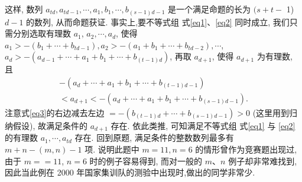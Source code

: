 这样, 数列 $a_{t d}, a_{t d-1}, \cdots, a_1, b_1, \cdots, b_{(s-1) d-1}$ 是一个满足命题的长为 $(s+t-$ 1) $d-1$ 的数列, 从而命题获证.
事实上,要不等式组 式\ref{eq1}、\ref{eq2} 同时成立, 我们只需分别选取有理数 $a_1$, $a_2, \cdots, a_d$, 使得 $a_1>-\left(b_1+\cdots+b_{t d-1}\right), a_2>-\left(a_1+b_1+\cdots+b_{t d-2}\right), \cdots$, $a_d>-\left(a_{d-1}+\cdots+a_1+b_1+\cdots+b_{(t-1) d}\right)$, 再取 $a_{d+1}$, 使得 $a_{d+1}$ 为有理数, 且
$$
\begin{gathered}
-\left(a_d+\cdots+a_1+b_1+\cdots+b_{(t-1) d-1}\right) \\
<a_{d+1}<-\left(a_d+\cdots+a_1+b_1+\cdots+b_{(s-1) d-1}\right) .
\end{gathered} \label{eq3}
$$
注意式\ref{eq3}的右边减去左边 $=-\left(b_{(t-1) d}+\cdots+b_{(s-1) d-1}\right)>0$ (这里用到归纳假设), 故满足条件的 $a_{d+1}$ 存在.
依此类推, 可知满足不等式组 式\ref{eq1} 与 \ref{eq2} 的有理数 $a_1, \cdots, a_{t d}$ 存在.
回到原题, 满足条件的整数数列最多有 $m+n-(m, n)-1$ 项.
说明此题中 $m=11, n=6$ 的情形曾作为竞赛题出现过, 由于 $m==11$,
$n=6$ 时的例子容易得到, 而对一般的 $m 、 n$ 例子却非常难找到, 因此当此例在 2000 年国家集训队的测验中出现时,做出的同学非常少.


